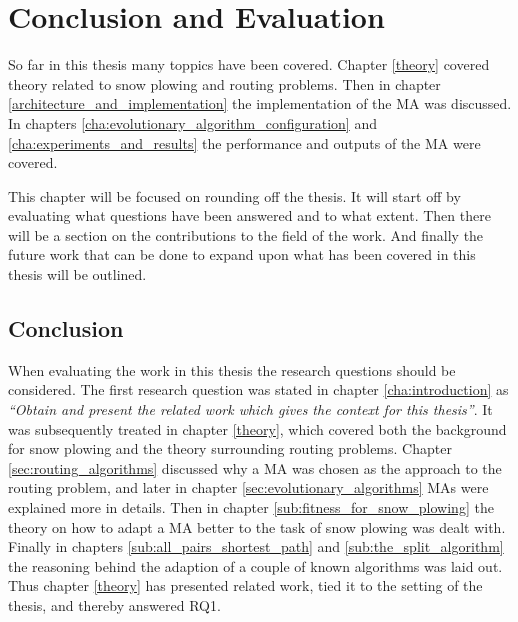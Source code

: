 \chapter{Conclusion and Evaluation}

So far in this thesis many toppics have been covered. Chapter \ref{theory} covered theory related to snow plowing and routing problems. Then in chapter \ref{architecture_and_implementation} the implementation of the MA was discussed. In chapters \ref{cha:evolutionary_algorithm_configuration} and \ref{cha:experiments_and_results} the performance and outputs of the MA were covered.

This chapter will be focused on rounding off the thesis. It will start off by evaluating what questions have been answered and to what extent. Then there will be a section on the contributions to the field of the work. And finally the future work that can be done to expand upon what has been covered in this thesis will be outlined.

\section{Conclusion}

When evaluating the work in this thesis the research questions should be considered. The first research question was stated in chapter \ref{cha:introduction} as \emph{\enquote{Obtain and present the related work which gives the context for this thesis}}. It was subsequently treated in chapter \ref{theory}, which covered both the background for snow plowing and the theory surrounding routing problems. Chapter \ref{sec:routing_algorithms} discussed why a MA was chosen as the approach to the routing problem, and later in chapter \ref{sec:evolutionary_algorithms} MAs were explained more in details. Then in chapter \ref{sub:fitness_for_snow_plowing} the theory on how to adapt a MA better to the task of snow plowing was dealt with. Finally in chapters \ref{sub:all_pairs_shortest_path} and \ref{sub:the_split_algorithm} the reasoning behind the adaption of a couple of known algorithms was laid out. Thus chapter \ref{theory} has presented related work, tied it to the setting of the thesis, and thereby answered RQ1.

